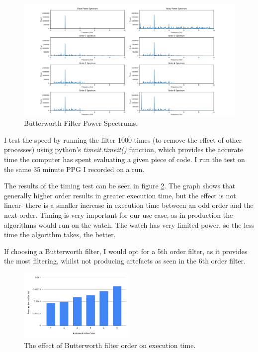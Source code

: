 \documentclass[12pt,a4paper,twoside,openany]{report}
\begin{document}
\begin{figure}
	\centering
	\includegraphics[width=\textwidth]{figs/butterworth-validity.png}
	\caption{Butterworth Filter Power Spectrums.}
	\label{fig:butterworth-validity}
\end{figure}


I test the speed by running the filter 1000 times (to remove the effect of
other processes) using python's
\emph{timeit.timeit()} function, which provides the accurate time the computer
has spent evaluating a given piece of code. I run the test on the same 35
minute PPG I recorded on a run. 

The results of the timing test can be seen in figure \ref{fig:butter-time}.
The graph shows that generally higher order results in greater
execution time, but the effect is not linear- there is a smaller increase
in execution time 
between an odd order and the next order. Timing is very important for our use
case, as in production the algorithms would run on the watch. The watch has
very limited power, so the less time the algorithm takes, the better.

If choosing a Butterworth filter, I would opt for a 5th order filter, as it
provides the most filtering, whilst not producing artefacts as seen in the 6th
order filter. 

\begin{figure}[tbh]
	\centerline{\includegraphics[width=0.5\textwidth]{figs/butter-time.png}}
	\caption{The effect of Butterworth filter order on execution time.}
	\label{fig:butter-time}
\end{figure}
\end{document}
